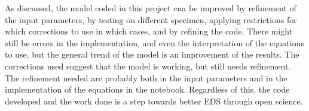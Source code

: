 As discussed, the model coded in this project cna be improved by refinement of the input parameters, by testing on different specimen, applying restrictions for which corrections to use in which cases, and by refining the code.
There might still be errors in the implementation, and even the interpretation of the equations to use, but the general trend of the model is an improvement of the results.
The corrections used suggest that the model is working, but still needs refinement.
The refinement needed are probably both in the input parameters and in the implementation of the equations in the notebook.
Regardless of this, the code developed and the work done is a step towards better EDS through open science.












